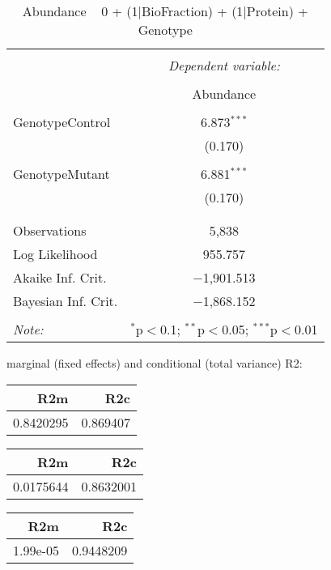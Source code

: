 \documentclass[11pt]{report}
\begin{document}
\begin{table}[!htbp] \centering 
  \caption{Abundance ~ 0 + (1|BioFraction) + (1|Protein) + Genotype} 
  \label{} 
\begin{tabular}{@{\extracolsep{5pt}}lc} 
\\[-1.8ex]\hline 
\hline \\[-1.8ex] 
 & \multicolumn{1}{c}{\textit{Dependent variable:}} \\ 
\cline{2-2} 
\\[-1.8ex] & Abundance \\ 
\hline \\[-1.8ex] 
 GenotypeControl & 6.873$^{***}$ \\ 
  & (0.170) \\ 
  & \\ 
 GenotypeMutant & 6.881$^{***}$ \\ 
  & (0.170) \\ 
  & \\ 
\hline \\[-1.8ex] 
Observations & 5,838 \\ 
Log Likelihood & 955.757 \\ 
Akaike Inf. Crit. & $-$1,901.513 \\ 
Bayesian Inf. Crit. & $-$1,868.152 \\ 
\hline 
\hline \\[-1.8ex] 
\textit{Note:}  & \multicolumn{1}{r}{$^{*}$p$<$0.1; $^{**}$p$<$0.05; $^{***}$p$<$0.01} \\ 
\end{tabular} 
\end{table} 
marginal (fixed effects) and conditional (total variance) R2:

\begin{tabular}{r|r}
\hline
R2m & R2c\\
\hline
0.8420295 & 0.869407\\
\hline
\end{tabular}

\begin{tabular}{r|r}
\hline
R2m & R2c\\
\hline
0.0175644 & 0.8632001\\
\hline
\end{tabular}

\begin{tabular}{r|r}
\hline
R2m & R2c\\
\hline
1.99e-05 & 0.9448209\\
\hline
\end{tabular}
\end{document}
